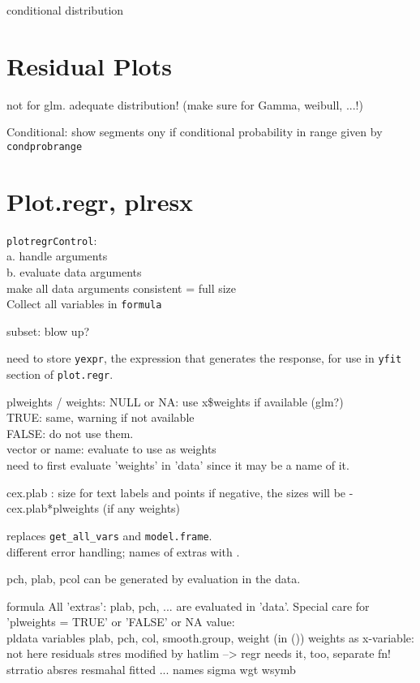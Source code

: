 \documentclass[11pt]{article}
\def\T{\texttt}
\begin{document}
conditional distribution

\section{Residual Plots}
not for glm. adequate distribution! (make sure for Gamma, weibull, ...!)

Conditional: show segments ony if conditional probability in range given by 
\T{condprobrange}

\section{Plot.regr, plresx}
\Itm
\T{plotregrControl}:\\
a. handle arguments
\\
b. evaluate data arguments\\
   make all data arguments consistent = full size\\
Collect all variables in \T{formula}

     subset: blow up?

need to store \T{yexpr}, the expression that generates the response,
for use in \T{yfit} section of \T{plot.regr}.

plweights / weights:
NULL or NA: use x\$weights if available (glm?)\\
TRUE: same, warning if not available\\
FALSE: do not use them.\\
vector or name: evaluate to use as weights\\
\Arrow need to first evaluate 'weights' in 'data' since it may be a name of it.

cex.plab : size for text labels and points
if negative, the sizes will be  -cex.plab*plweights  (if any weights)

 replaces \T{get\_all\_vars} and \T{model.frame}.\\
 different error handling; names of extras with .

pch, plab, pcol can be generated by evaluation in the data.

formula  
All 'extras': plab, pch, ... 
  are evaluated in 'data'. 
  Special care for 'plweights = TRUE' or 'FALSE' or NA
value:\\
pldata
  variables
  plab, pch, col, smooth.group, weight  (in ())
    weights as x-variable: not here
residuals
stres
  modified by hatlim --> regr needs it, too, separate fn!
strratio
absres
resmahal
fitted
... names
sigma
wgt
wsymb
\end{document}
